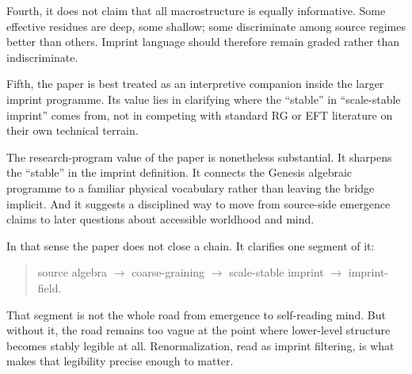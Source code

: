 \documentclass[12pt]{article}
\begin{document}
Fourth, it does not claim that all macrostructure is equally informative. Some effective residues are deep, some shallow; some discriminate among source regimes better than others. Imprint language should therefore remain graded rather than indiscriminate.

Fifth, the paper is best treated as an interpretive companion inside the larger imprint programme. Its value lies in clarifying where the ``stable'' in ``scale-stable imprint'' comes from, not in competing with standard RG or EFT literature on their own technical terrain.

The research-program value of the paper is nonetheless substantial. It sharpens the ``stable'' in the imprint definition. It connects the Genesis algebraic programme to a familiar physical vocabulary rather than leaving the bridge implicit. And it suggests a disciplined way to move from source-side emergence claims to later questions about accessible worldhood and mind.

In that sense the paper does not close a chain. It clarifies one segment of it:

\begin{quote}
source algebra $\to$ coarse-graining $\to$ scale-stable imprint $\to$ imprint-field.
\end{quote}

That segment is not the whole road from emergence to self-reading mind. But without it, the road remains too vague at the point where lower-level structure becomes stably legible at all. Renormalization, read as imprint filtering, is what makes that legibility precise enough to matter.
\end{document}
